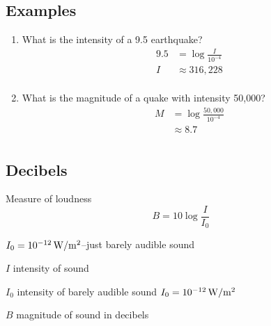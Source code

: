 \documentclass{exam}
\begin{document}
  \subsection{Examples}
  \begin{enumerate}

    \item What is the intensity of a 9.5 earthquake?
      \begin{align*}
        9.5 & = \log \frac{I}{10^{-4}} \\
        I   & \approx 316,228 \\
      \end{align*}

    \item What is the magnitude of a quake with intensity 50,000?
      \begin{align*}
        M & = \log \frac{50,000}{10^{-4}} \\
           & \approx 8.7 \\
      \end{align*}

  \end{enumerate}

  \subsection{Decibels}
  Measure of loudness
  \[
    B = 10 \log \frac{I}{I_0}
  \]
  
  $I_0 = \unit[10^{-12}]{W/m^2}$--just barely audible sound 

  \begin{itemize*}
    \item $I$ intensity of sound 
    \item $I_0$ intensity of barely audible sound $I_0 = \unit[10^{-12}]{W/m^2}$
    \item $B$ magnitude of sound in decibels
  \end{itemize*}
\end{document}
